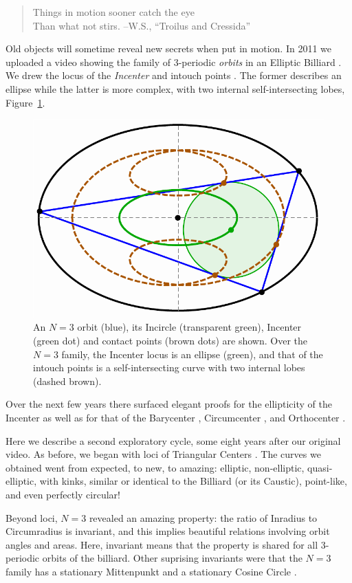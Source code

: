 \begin{quote}
Things in motion sooner catch the eye\\
Than what not stirs. --W.S., ``Troilus and Cressida'' 
\end{quote}

Old objects will sometime reveal new secrets when put in motion. In 2011 we uploaded a video \cite{dsr_vid11d} showing the family of 3-periodic {\em orbits} in an Elliptic Billiard  \cite{sergei91,birkhoff66}. We drew the locus of the {\em Incenter} and intouch points \cite{mw}. The former describes an ellipse while the latter is more complex, with two internal self-intersecting lobes, Figure~\ref{fig:intro-plot}.

\begin{figure}
    \centering
    \includegraphics[width=.5\textwidth]{pics/0001_intro_plot.pdf}
    \caption{An $N=3$ orbit (blue), its Incircle (transparent green), Incenter (green dot) and contact points (brown dots) are shown. Over the $N=3$ family, the Incenter locus is an ellipse (green), and that of the intouch points is a self-intersecting curve with two internal lobes (dashed brown).}
    \label{fig:intro-plot}
\end{figure}

Over the next few years there surfaced elegant proofs for the ellipticity of the Incenter \cite{olga14,ronaldo16} as well as for that of the Barycenter \cite{sergei2016,ronaldo19}, Circumcenter  \cite{corentin19,ronaldo19}, and Orthocenter \cite{ronaldo19}.

Here we describe a second exploratory cycle, some eight years after our original video. As before, we began with loci of Triangular Centers \cite{mw}. The curves we obtained went from expected, to new, to amazing: elliptic, non-elliptic, quasi-elliptic, with kinks, similar or identical to the Billiard (or its Caustic), point-like, and even perfectly circular!

Beyond loci, $N=3$ revealed an amazing property: the ratio of Inradius to Circumradius is invariant, and this implies beautiful relations involving orbit angles and areas.
Here,  invariant means that the property is shared for all 3-periodic orbits of the billiard. Other suprising invariants were that the $N=3$ family has a stationary Mittenpunkt \cite{mw} and a stationary Cosine Circle \cite{mw}. 


